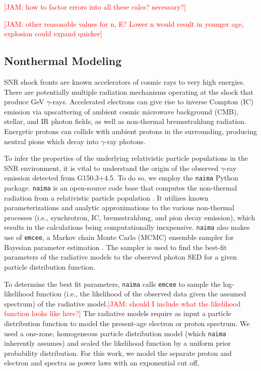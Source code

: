 \documentclass[iop]{emulateapj}
\newcommand{\kibitz}[2]{\ifnum\Comments=1\textcolor{#1}{#2}\fi}
\newcommand{\jamie}[1]{\kibitz{red}      {[JAM: #1]}}
\newcommand{\gam}{$\gamma$-ray}
\newcommand{\nai}{{\tt naima}}
\newcommand{\emc}{{\tt emcee}}
\newcommand{\Gone}{G150.3+4.5}
\begin{document}
\jamie{how to factor errors into all these calcs? necessary?}

\jamie{other reasonable values for n, E? Lower n would result in younger age, explosion could expand quicker}
 
\subsection{Nonthermal Modeling}\label{sec:naima}


SNR shock fronts are known accelerators of cosmic rays to very high energies. There are potentially multiple radiation mechanisms operating at the shock that produce GeV \gam{}s. Accelerated electrons can give rise to inverse Compton (IC) emission via upscattering of ambient cosmic microwave background (CMB), stellar, and IR photon fields, as well as non-thermal bremsstrahlung radiation. Energetic protons can collide with ambient protons in the surrounding, producing neutral pions which decay into \gam{} photons. 

To infer the properties of the underlying relativistic particle populations in the SNR environment, it is vital to understand the origin of the observed \gam{} emission detected from  \Gone{}. To do so, we employ the \nai{} Python package. \nai{} is an open-source code base that computes the non-thermal radiation from a relativistic particle population \citep{Zabalza15}. It utilizes known parameterizations and analytic approximations to the various non-thermal processes (i.e., synchrotron, IC, bremsstrahlung, and pion decay emission), which results in the calculations being computationally inexpensive. \nai{} also makes use of \emc{}, a Markov chain Monte Carlo (MCMC) ensemble sampler for Bayesian parameter estimation \citep{Foreman13}. The sampler is used to find the best-fit parameters of the radiative models to the observed photon SED for a given particle distribution function. 

To determine the best fit parameters, \nai{} calls \emc{} to sample the log-likelihood function (i.e., the likelihood of the observed data given the assumed spectrum) of the radiative model.\jamie{should I include what the likelihood function looks like here?} The radiative models require as input a particle distribution function to model the present-age electron or proton spectrum. We used a one-zone, homogeneous particle distribution model (which \nai{} inherently assumes) and scaled the likelihood function by a uniform prior probability distribution. For this work, we model the separate proton and electron and spectra as power laws with an exponential cut off,
\end{document}
